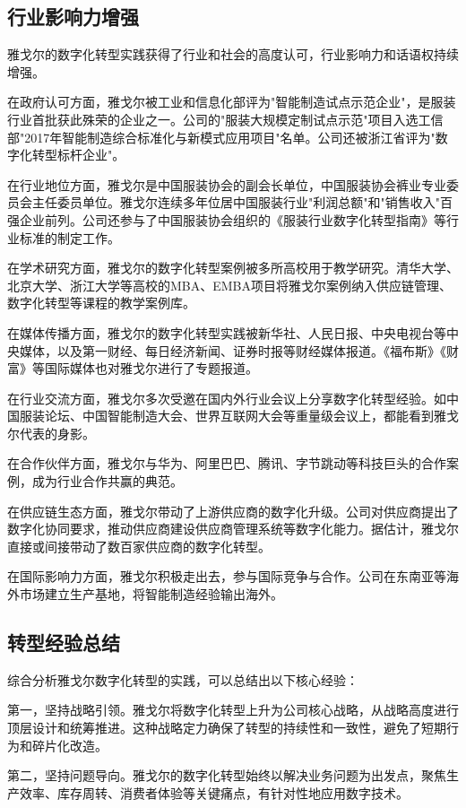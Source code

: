 \documentclass[12pt,a4paper]{article}
\begin{document}
\subsection{行业影响力增强}

雅戈尔的数字化转型实践获得了行业和社会的高度认可，行业影响力和话语权持续增强。

在政府认可方面，雅戈尔被工业和信息化部评为"智能制造试点示范企业"，是服装行业首批获此殊荣的企业之一。公司的"服装大规模定制试点示范"项目入选工信部"2017年智能制造综合标准化与新模式应用项目"名单。公司还被浙江省评为"数字化转型标杆企业"。

在行业地位方面，雅戈尔是中国服装协会的副会长单位，中国服装协会裤业专业委员会主任委员单位。雅戈尔连续多年位居中国服装行业"利润总额"和"销售收入"百强企业前列。公司还参与了中国服装协会组织的《服装行业数字化转型指南》等行业标准的制定工作。

在学术研究方面，雅戈尔的数字化转型案例被多所高校用于教学研究。清华大学、北京大学、浙江大学等高校的MBA、EMBA项目将雅戈尔案例纳入供应链管理、数字化转型等课程的教学案例库。

在媒体传播方面，雅戈尔的数字化转型实践被新华社、人民日报、中央电视台等中央媒体，以及第一财经、每日经济新闻、证券时报等财经媒体报道。《福布斯》《财富》等国际媒体也对雅戈尔进行了专题报道。

在行业交流方面，雅戈尔多次受邀在国内外行业会议上分享数字化转型经验。如中国服装论坛、中国智能制造大会、世界互联网大会等重量级会议上，都能看到雅戈尔代表的身影。

在合作伙伴方面，雅戈尔与华为、阿里巴巴、腾讯、字节跳动等科技巨头的合作案例，成为行业合作共赢的典范。

在供应链生态方面，雅戈尔带动了上游供应商的数字化升级。公司对供应商提出了数字化协同要求，推动供应商建设供应商管理系统等数字化能力。据估计，雅戈尔直接或间接带动了数百家供应商的数字化转型。

在国际影响力方面，雅戈尔积极走出去，参与国际竞争与合作。公司在东南亚等海外市场建立生产基地，将智能制造经验输出海外。

\subsection{转型经验总结}

综合分析雅戈尔数字化转型的实践，可以总结出以下核心经验：

第一，坚持战略引领。雅戈尔将数字化转型上升为公司核心战略，从战略高度进行顶层设计和统筹推进。这种战略定力确保了转型的持续性和一致性，避免了短期行为和碎片化改造。

第二，坚持问题导向。雅戈尔的数字化转型始终以解决业务问题为出发点，聚焦生产效率、库存周转、消费者体验等关键痛点，有针对性地应用数字技术。
\end{document}
